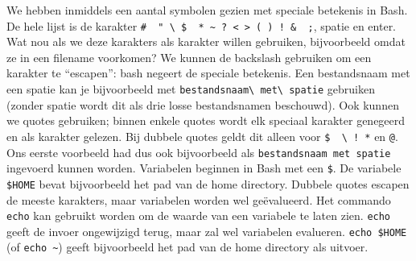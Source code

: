 We hebben inmiddels een aantal symbolen gezien met speciale betekenis in Bash. De hele lijst is de karakter \texttt{\#\ \textquotesingle{}\ "\ \textbackslash{}\ \$\ \textasciigrave{}\ *\ \textasciitilde\ ?\ \textless{}\ \textgreater{}\ (\ )\ !\ \&\ \textbar{}\ ;}, spatie en enter. Wat nou als we deze karakters als karakter willen gebruiken, bijvoorbeeld omdat ze in een filename voorkomen? We kunnen de backslash gebruiken om een karakter te ``escapen'': bash negeert de speciale betekenis. Een bestandsnaam met een spatie kan je bijvoorbeeld met \texttt{bestandsnaam\textbackslash{}\ met\textbackslash{}\ spatie} gebruiken (zonder spatie wordt dit als drie losse bestandsnamen beschouwd). Ook kunnen we quotes gebruiken; binnen enkele quotes wordt elk speciaal karakter genegeerd en als karakter gelezen. Bij dubbele quotes geldt dit alleen voor \texttt{\$\ \textasciigrave{}\ \textbackslash{}\ !\ *} en \texttt{@}. Ons eerste voorbeeld had dus ook bijvoorbeeld als \texttt{\textquotesingle{}bestandsnaam\ met\ spatie\textquotesingle{}} ingevoerd kunnen worden. Variabelen beginnen in Bash met een \texttt{\$}. De variabele \texttt{\$HOME} bevat bijvoorbeeld het pad van de home directory. Dubbele quotes escapen de meeste karakters, maar variabelen worden wel geëvalueerd. Het commando \texttt{echo} kan gebruikt worden om de waarde van een variabele te laten zien. \texttt{echo} geeft de invoer ongewijzigd terug, maar zal wel variabelen evalueren. \texttt{echo\ \$HOME} (of \texttt{echo\ \textasciitilde}) geeft bijvoorbeeld het pad van de home directory als uitvoer.

